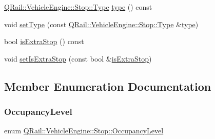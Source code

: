 \begin{DoxyCompactItemize}
\item 
\mbox{\hyperlink{classQRail_1_1VehicleEngine_1_1Stop_af078938bc06ff906b6fc843d8c0206fa}{Q\+Rail\+::\+Vehicle\+Engine\+::\+Stop\+::\+Type}} \mbox{\hyperlink{classQRail_1_1VehicleEngine_1_1Stop_abe8f35c16d98f1ea6bd95a525f90c0aa}{type}} () const
\item 
void \mbox{\hyperlink{classQRail_1_1VehicleEngine_1_1Stop_a6312361e41e4fcf40f509a008cee3361}{set\+Type}} (const \mbox{\hyperlink{classQRail_1_1VehicleEngine_1_1Stop_af078938bc06ff906b6fc843d8c0206fa}{Q\+Rail\+::\+Vehicle\+Engine\+::\+Stop\+::\+Type}} \&\mbox{\hyperlink{classQRail_1_1VehicleEngine_1_1Stop_abe8f35c16d98f1ea6bd95a525f90c0aa}{type}})
\item 
bool \mbox{\hyperlink{classQRail_1_1VehicleEngine_1_1Stop_aeebc79d39ddfed82ea2c44f0e7cd0a95}{is\+Extra\+Stop}} () const
\item 
void \mbox{\hyperlink{classQRail_1_1VehicleEngine_1_1Stop_a371e763f4d513b91fdb03228a5d3032b}{set\+Is\+Extra\+Stop}} (const bool \&\mbox{\hyperlink{classQRail_1_1VehicleEngine_1_1Stop_aeebc79d39ddfed82ea2c44f0e7cd0a95}{is\+Extra\+Stop}})
\end{DoxyCompactItemize}


\subsection{Member Enumeration Documentation}
\mbox{\label{classQRail_1_1VehicleEngine_1_1Stop_ad967ed81b19762bd582c1af07354a6d4}} 
\subsubsection{\texorpdfstring{OccupancyLevel}{OccupancyLevel}}
{\footnotesize\ttfamily enum \mbox{\hyperlink{classQRail_1_1VehicleEngine_1_1Stop_ad967ed81b19762bd582c1af07354a6d4}{Q\+Rail\+::\+Vehicle\+Engine\+::\+Stop\+::\+Occupancy\+Level}}\hspace{0.3cm}{\ttfamily [strong]}}

